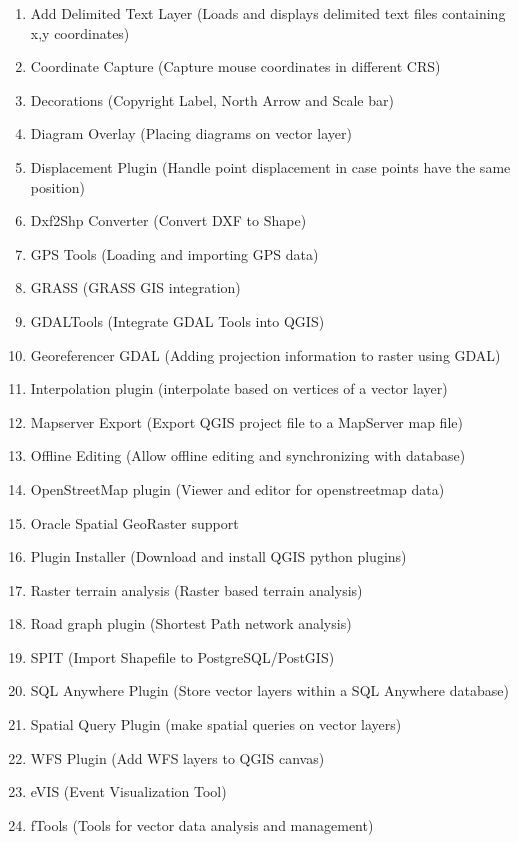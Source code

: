 
\begin{enumerate}
\item Add Delimited Text Layer (Loads and displays delimited text files
containing x,y coordinates)
\item Coordinate Capture (Capture mouse coordinates in different CRS)
\item Decorations (Copyright Label, North Arrow and Scale bar)
\item Diagram Overlay (Placing diagrams on vector layer)
\item Displacement Plugin (Handle point displacement in case points have the same position)
\item Dxf2Shp Converter (Convert DXF to Shape)
\item GPS Tools (Loading and importing GPS data)
\item GRASS (GRASS GIS integration)
\item GDALTools (Integrate GDAL Tools into QGIS)
\item Georeferencer GDAL (Adding projection information to raster using GDAL)
\item Interpolation plugin (interpolate based on vertices of a vector layer)
\item Mapserver Export (Export QGIS project file to a MapServer map file)
\item Offline Editing (Allow offline editing and synchronizing with database)
\item OpenStreetMap plugin (Viewer and editor for openstreetmap data)
\item Oracle Spatial GeoRaster support
\item Plugin Installer (Download and install QGIS python plugins)
\item Raster terrain analysis (Raster based terrain analysis)
\item Road graph plugin (Shortest Path network analysis)
\item SPIT (Import Shapefile to PostgreSQL/PostGIS)
\item SQL Anywhere Plugin (Store vector layers within a SQL Anywhere database)
\item Spatial Query Plugin (make spatial queries on vector layers)
\item WFS Plugin (Add WFS layers to QGIS canvas)
\item eVIS (Event Visualization Tool)
\item fTools (Tools for vector data analysis and management)
\end{enumerate}

